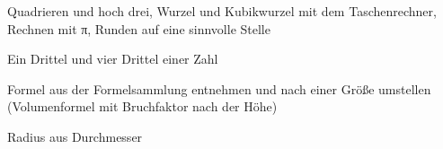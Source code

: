 \begin{aufgabe}{Quadrieren und hoch drei, Wurzel und Kubikwurzel mit dem Taschenrechner, Rechnen mit π, Runden auf eine sinnvolle Stelle}
\end{aufgabe}

\begin{aufgabe}{Ein Drittel und vier Drittel einer Zahl}
\end{aufgabe}

\begin{aufgabe}{Formel aus der Formelsammlung entnehmen und nach einer Größe umstellen (Volumenformel mit Bruchfaktor nach der Höhe)}
\end{aufgabe}

\begin{aufgabe}{Radius aus Durchmesser}
\end{aufgabe}

